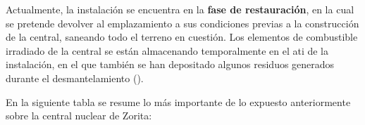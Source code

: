 Actualmente, la instalación se encuentra en la \textbf{fase de restauración}, en la cual se pretende devolver al emplazamiento a sus condiciones previas a la construcción de la central, saneando todo el terreno en cuestión. Los elementos de combustible irradiado de la central se están almacenando temporalmente en el \acrfull{ati} de la instalación, en el que también se han depositado algunos residuos generados durante el desmantelamiento (\cite{enresa_desmantelamiento_zorita}).

En la siguiente tabla se resume lo más importante de lo expuesto anteriormente sobre la central nuclear de Zorita:

\begin{table}[h]
    \caption{Características y fechas clave de la Central Nuclear José Cabrera (\cite{csn_info_zorita}).}
    \label{tabla:resumen_zorita}
    \end{table}

